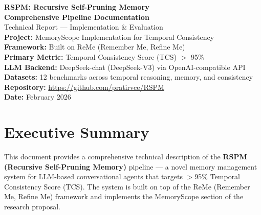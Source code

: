 \documentclass[11pt,a4paper]{article}
\begin{document}
\begin{titlepage}
\centering
\vspace*{2cm}
{\Huge\bfseries RSPM: Recursive Self-Pruning Memory\\[0.3cm]}
{\Large\bfseries Comprehensive Pipeline Documentation\\[0.5cm]}
{\large Technical Report --- Implementation \& Evaluation\\[1.5cm]}
{\large\textbf{Project:} MemoryScope Implementation for Temporal Consistency\\[0.3cm]}
{\large\textbf{Framework:} Built on ReMe (Remember Me, Refine Me)\\[0.3cm]}
{\large\textbf{Primary Metric:} Temporal Consistency Score (TCS) $>$ 95\%\\[0.3cm]}
{\large\textbf{LLM Backend:} DeepSeek-chat (DeepSeek-V3) via OpenAI-compatible API\\[0.3cm]}
{\large\textbf{Datasets:} 12 benchmarks across temporal reasoning, memory, and consistency\\[1.5cm]}
{\large\textbf{Repository:} \url{https://github.com/pratirvce/RSPM}\\[0.3cm]}
{\large\textbf{Date:} February 2026\\[2cm]}
\vfill
\end{titlepage}

\tableofcontents
\newpage

\section{Executive Summary}

This document provides a comprehensive technical description of the \textbf{RSPM (Recursive Self-Pruning Memory)} pipeline --- a novel memory management system for LLM-based conversational agents that targets $>$95\% Temporal Consistency Score (TCS). The system is built on top of the ReMe (Remember Me, Refine Me) framework and implements the MemoryScope section of the research proposal.
\end{document}
